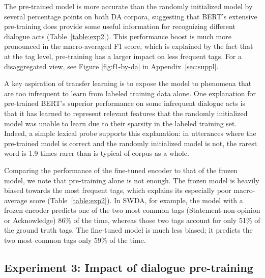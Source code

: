 \documentclass[11pt,a4paper]{article}
\begin{document}
The pre-trained model is more accurate than the randomly initialized model by several percentage points on both DA corpora,
suggesting that BERT's extensive pre-training does provide some useful information for recognizing different dialogue acts (Table~\ref{table:exp2}).
This performance boost is much more pronounced in the macro-averaged F1 score,
which is explained by the fact that at the tag level, pre-training has a larger impact on less frequent tags.
For a disaggregated view, see Figure \ref{fig:f1-by-da} in Appendix~\ref{sec:suppl}.

A key aspiration of transfer learning is to expose the model to phenomena that are too infrequent to learn from labeled training data alone.
One explanation for pre-trained BERT's superior performance on some infrequent dialogue acts is that it has learned to represent relevant features
that the randomly initialized model was unable to learn due to their sparsity in the labeled training set.
Indeed, a simple lexical probe supports this explanation: in utterances where the pre-trained model is correct and the randomly initialized model is not,
the rarest word is 1.9 times rarer than is typical of corpus as a whole.

Comparing the performance of the fine-tuned encoder to that of the frozen model, we note that pre-training alone is not enough.
The frozen model is heavily biased towards the most frequent tags, which explains its especially poor macro-average score (Table~\ref{table:exp2}).
In SWDA, for example, the model with a frozen encoder predicts one of the two most common tags (Statement-non-opinion or Acknowledge) 86\% of the time, whereas those two
tags account for only 51\% of the ground truth tags.
The fine-tuned model is much less biased; it predicts the two most common tags only 59\% of the time.




\subsection{Experiment 3: Impact of dialogue pre-training} \label{sec:experiment3} %
\end{document}
